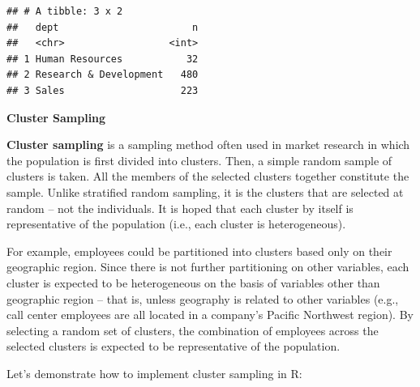 \documentclass[]{book}
\newenvironment{Shaded}{\begin{snugshade}}{\end{snugshade}}
\newcommand{\CommentTok}[1]{\textcolor[rgb]{0.56,0.35,0.01}{\textit{#1}}}
\newcommand{\DataTypeTok}[1]{\textcolor[rgb]{0.13,0.29,0.53}{#1}}
\newcommand{\FloatTok}[1]{\textcolor[rgb]{0.00,0.00,0.81}{#1}}
\newcommand{\KeywordTok}[1]{\textcolor[rgb]{0.13,0.29,0.53}{\textbf{#1}}}
\newcommand{\NormalTok}[1]{#1}
\newcommand{\OperatorTok}[1]{\textcolor[rgb]{0.81,0.36,0.00}{\textbf{#1}}}
\newcommand{\StringTok}[1]{\textcolor[rgb]{0.31,0.60,0.02}{#1}}
\begin{document}
\begin{Shaded}
\end{Shaded}

\begin{verbatim}
## # A tibble: 3 x 2
##   dept                       n
##   <chr>                  <int>
## 1 Human Resources           32
## 2 Research & Development   480
## 3 Sales                    223
\end{verbatim}

\textbf{Cluster Sampling}

\textbf{Cluster sampling} is a sampling method often used in market research in which the population is first divided into clusters. Then, a simple random sample of clusters is taken. All the members of the selected clusters together constitute the sample. Unlike stratified random sampling, it is the clusters that are selected at random -- not the individuals. It is hoped that each cluster by itself is representative of the population (i.e., each cluster is heterogeneous).

For example, employees could be partitioned into clusters based only on their geographic region. Since there is not further partitioning on other variables, each cluster is expected to be heterogeneous on the basis of variables other than geographic region -- that is, unless geography is related to other variables (e.g., call center employees are all located in a company's Pacific Northwest region). By selecting a random set of clusters, the combination of employees across the selected clusters is expected to be representative of the population.

Let's demonstrate how to implement cluster sampling in R:
\end{document}
